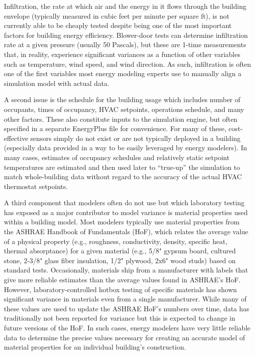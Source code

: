 \documentclass[preprint, review, 12pt]{elsarticle}
\begin{document}
Infiltration, the rate at which air and the energy in it flows through the building envelope (typically measured in cubic feet per minute per square ft), is not currently able to be cheaply tested despite being one of the most important factors for building energy efficiency. Blower-door tests can determine infiltration rate at a given pressure (usually 50 Pascals), but these are 1-time measurements that, in reality, experience significant variances as a function of other variables such as temperature, wind speed, and wind direction. As such, infiltration is often one of the first variables most energy modeling experts use to manually align a simulation model with actual data.

A second issue is the schedule for the building usage which includes number of occupants, times of occupancy, HVAC setpoints, operations schedule, and many other factors. These also constitute inputs to the simulation engine, but often specified in a separate EnergyPlus file for convenience. For many of these, cost-effective sensors simply do not exist or are not typically deployed in a building (especially data provided in a way to be easily leveraged by energy modelers). In many cases, estimates of occupancy schedules and relatively static setpoint temperatures are estimated and then used later to ``true-up'' the simulation to match whole-building data without regard to the accuracy of the actual HVAC thermostat setpoints.

A third component that modelers often do not use but which laboratory testing has exposed as a major contributor to model variance is material properties used within a building model. Most modelers typically use material properties from the ASHRAE Handbook of Fundamentals (HoF), which relates the average value of a physical property (e.g., roughness, conductivity, density, specific heat, thermal absorptance) for a given material (e.g., 5/8" gypsum board, cultured stone, 2-3/8" glass fiber insulation, 1/2" plywood, 2x6" wood studs) based on standard tests. Occasionally, materials ship from a manufacturer with labels that give more reliable estimates than the average values found in ASHRAE's HoF. However, laboratory-controlled hotbox testing of specific materials has shown significant variance in materials even from a single manufacturer. While many of these values are used to update the ASHRAE HoF's numbers over time, data has traditionally not been reported for variance but this is expected to change in future versions of the HoF. In such cases, energy modelers have very little reliable data to determine the precise values necessary for creating an accurate model of material properties for an individual building's construction.
\end{document}
